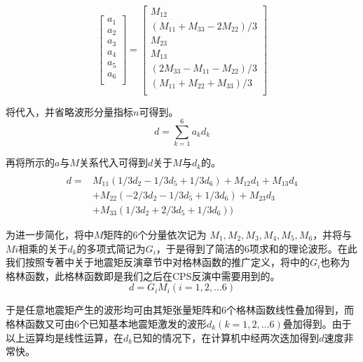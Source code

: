 \begin{equation}
\label{eq2_05}
\left[\begin{array}{c}
a_1\\
a_2\\
a_3\\
a_4\\
a_5\\
a_6\\
\end{array}\right]=
\left[\begin{array}{c}
M_{12}\\
(M_{11}+M_{33}-2M_{22})/3\\
M_{23}\\
M_{13}\\
(2M_{33}-M_{11}-M_{22})/3\\
(M_{11}+M_{22}+M_{33})/3\\
\end{array}\right]
\end{equation}

将代入，并省略波形分量指标$n$可得到。
\begin{equation}
\label{eq2_06}
d=\sum_{k=1}^{6}a_kd_k
\end{equation}

再将所示的$a$与$M$关系代入可得到$d$关于$M$与$d_k$的。
\begin{equation}
\label{eq2_07}
\begin{array}{rl}\\
d=&M_{11}(1/3d_2-1/3d_5+1/3d_6)+M_{12}d_1+M_{13}d_4\\
&+M_{22}(-2/3d_2-1/3d_5+1/3d_6)+M_{23}d_3\\
&+M_{33}(1/3d_2+2/3d_5+1/3d_6))
\end{array}
\end{equation}

为进一步简化，将中$M$矩阵的6个分量依次记为 $M_1,M_2,M_3,M_4,M_5,M_6$，并将与$Mi$相乘的关于$d_k$的多项式简记为$G_i$，于是得到了简洁的6项求和的理论波形。在此我们按照\citet{Stein2003}专著中关于地震矩反演章节中对格林函数的推广定义，将中的$G_i$也称为格林函数，此格林函数即是我们之后在CPS反演中需要用到的。
\begin{equation}
\label{eq2_08}
d=G_iM_i(i=1,2,...6)
\end{equation}

于是任意地震矩产生的波形均可由其矩张量矩阵和6个格林函数线性叠加得到，而格林函数又可由6个已知基本地震矩激发的波形$d_k(k=1,2,...6)$叠加得到。由于以上运算均是线性运算，在$d_k$已知的情况下，在计算机中经两次迭加得到$d$速度非常快。

